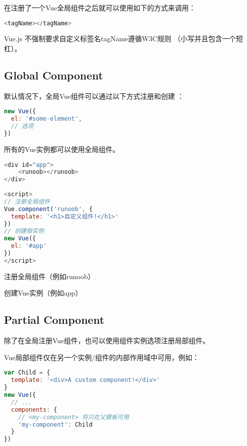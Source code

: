 在注册了一个Vue全局组件之后就可以使用如下的方式来调用：


\begin{lstlisting}[language=JavaScript]
<tagName></tagName>
\end{lstlisting}

Vue.js 不强制要求自定义标签名tagName遵循W3C规则 （小写并且包含一个短杠）。



\subsection{Global Component}


默认情况下，全局Vue组件可以通过以下方式注册和创建 ：


\begin{lstlisting}[language=JavaScript]
new Vue({
  el: '#some-element',
  // 选项
})
\end{lstlisting}


所有的Vue实例都可以使用全局组件。

\begin{lstlisting}[language=JavaScript]
<div id="app">
    <runoob></runoob>
</div>
 
<script>
// 注册全局组件
Vue.component('runoob', {
  template: '<h1>自定义组件!</h1>'
})
// 创建根实例
new Vue({
  el: '#app'
})
</script>
\end{lstlisting}

\begin{compactenum}
\item 注册全局组件（例如runoob）
\item 创建Vue实例（例如app）
\end{compactenum}










\subsection{Partial Component}

除了在全局注册Vue组件，也可以使用组件实例选项注册局部组件。

Vue局部组件仅在另一个实例/组件的内部作用域中可用，例如：


\begin{lstlisting}[language=JavaScript]
var Child = {
  template: '<div>A custom component!</div>'
}
new Vue({
  // ...
  components: {
    // <my-component> 将只在父模板可用
    'my-component': Child
  }
})
\end{lstlisting}

